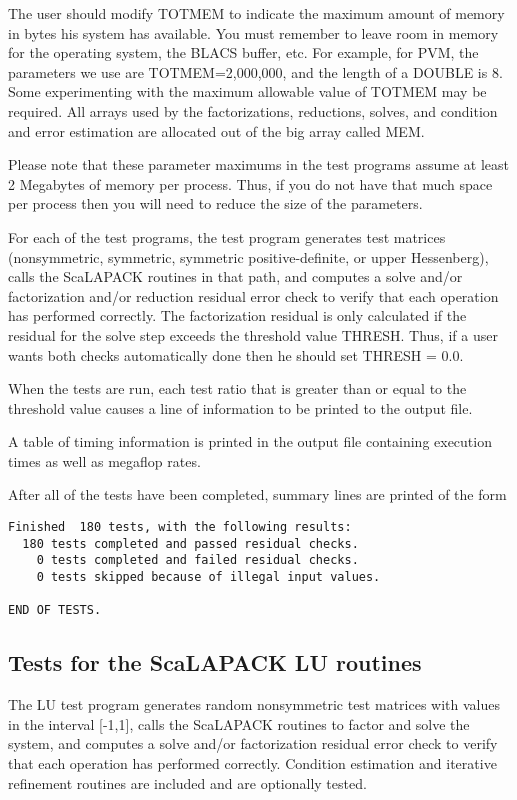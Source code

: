 \documentclass[11pt]{report}
\begin{document}
The user should modify TOTMEM to indicate the maximum amount of
memory in bytes his system has available.  You must remember to leave
room in memory for the operating system, the BLACS buffer, etc.
For example, for PVM, the
parameters we use are TOTMEM=2,000,000, and the length of a DOUBLE is 8.
Some experimenting with the maximum allowable value of TOTMEM
may be required.  All arrays used by the factorizations, reductions,
solves, and condition and error estimation are
allocated out of the big array called MEM.

Please note that these parameter maximums in the test programs assume at least 
2 Megabytes of memory per process.  Thus, if you do not have
that much space per process then you will need to reduce the size of
the parameters.

For each of the test programs, the test program
generates test matrices (nonsymmetric, symmetric, symmetric
positive-definite, or upper Hessenberg), calls the ScaLAPACK routines in
that path, and computes a solve and/or factorization and/or reduction
residual error check to verify 
that each operation has performed correctly.  The factorization residual
is only calculated if the residual for the solve step exceeds
the threshold value THRESH.  Thus, if a user wants both checks
automatically done then he should set THRESH = 0.0.

When the tests are run, each test ratio that is greater than or
equal to the threshold value causes a line of information to be
printed to the output file.

A table of timing information is printed in the output file containing
execution times as well as megaflop rates.

After all of the tests have been completed, summary lines are printed
of the form
\begin{verbatim}
Finished  180 tests, with the following results:
  180 tests completed and passed residual checks.
    0 tests completed and failed residual checks.
    0 tests skipped because of illegal input values.

END OF TESTS.
\end{verbatim}

\subsection{Tests for the ScaLAPACK LU routines}

The LU test program generates random nonsymmetric test matrices with
values in the interval [-1,1], calls the ScaLAPACK 
routines to factor and solve the system, and computes a solve and/or 
factorization residual error check to verify that each operation has performed 
correctly.  Condition estimation and iterative refinement routines are
included and are optionally tested.
\end{document}
